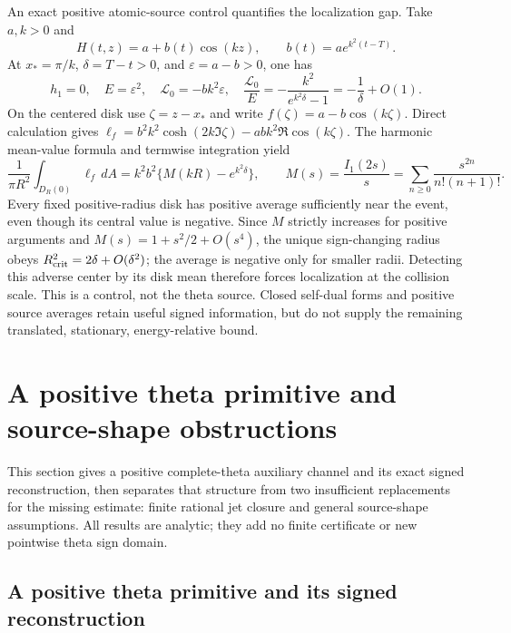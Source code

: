 \documentclass[11pt]{article}
\numberwithin{equation}{section}
\theoremstyle{definition}
\theoremstyle{remark}
\newcommand{\dd}{\,d}
\newcommand{\Lag}{\mathcal L}
\begin{document}
An exact positive atomic-source control quantifies the localization
gap.  Take \(a,k>0\) and
\[
 H(t,z)=a+b(t)\cos(kz),\qquad b(t)=ae^{k^2(t-T)}.
\]
At \(x_*=\pi/k\), \(\delta=T-t>0\), and
\(\varepsilon=a-b>0\), one has
\[
 h_1=0,\quad E=\varepsilon^2,\quad
 \Lag_0=-bk^2\varepsilon,\quad
 \frac{\Lag_0}{E}=-\frac{k^2}{e^{k^2\delta}-1}
                           =-\frac1\delta+O(1).
\]
On the centered disk use \(\zeta=z-x_*\) and write
\(f(\zeta)=a-b\cos(k\zeta)\).  Direct
calculation gives
\(\ell_f=b^2k^2\cosh(2k\Im\zeta)-abk^2\Re\cos(k\zeta)\).
The harmonic mean-value formula and termwise integration yield
\begin{equation}
 \frac1{\pi R^2}\int_{D_R(0)}\ell_f\dd A
 =k^2b^2\{M(kR)-e^{k^2\delta}\},\qquad
 M(s)=\frac{I_1(2s)}s
       =\sum_{n\ge0}\frac{s^{2n}}{n!(n+1)!}.
 \label{sf:atomic-disk}
\end{equation}
Every fixed positive-radius disk has positive average sufficiently
near the event, even though its central value is negative.
Since \(M\) strictly increases for positive arguments and
\(M(s)=1+s^2/2+O(s^4)\), the unique sign-changing radius obeys
\(R_{\rm crit}^2=2\delta+O(\delta^2)\); the average is negative only
for smaller radii.  Detecting this adverse center by its disk mean
therefore forces localization at the collision scale.  This is a
control, not the theta source.  Closed self-dual forms and positive
source averages retain useful signed information, but do not
supply the remaining translated, stationary, energy-relative bound.



\section{A positive theta primitive and source-shape obstructions}
\label{pp:section}

This section gives a positive complete-theta auxiliary channel and its
exact signed reconstruction, then separates that structure from two
insufficient replacements for the missing estimate: finite rational
jet closure and general source-shape assumptions. All results are
analytic; they add no finite certificate or new pointwise theta sign
domain.

\subsection{A positive theta primitive and its signed reconstruction}
\label{pp:primitive-section}
\end{document}
